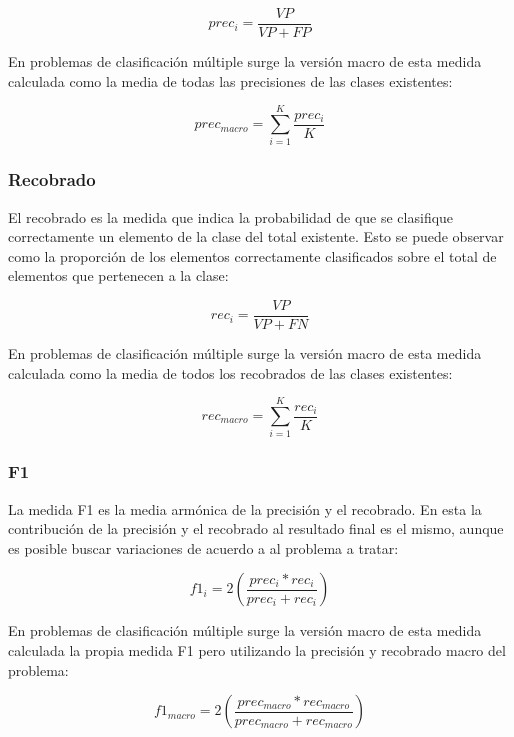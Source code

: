 \begin{equation}
	prec_i = \frac{VP}{VP + FP}
\end{equation}

En problemas de clasificación múltiple surge la versión macro de esta medida calculada como la media de todas
las precisiones de las clases existentes:

\begin{equation}
	prec_{macro} = \sum^K_{i=1} \frac{prec_i}{K}
\end{equation}

\subsubsection{Recobrado}

El recobrado es la medida que indica la probabilidad de que se clasifique correctamente un elemento de la clase
del total existente. Esto se puede observar como la proporción de los elementos correctamente clasificados sobre el 
total de elementos que pertenecen a la clase:

\begin{equation}
	rec_i = \frac{VP}{VP + FN}
\end{equation}

En problemas de clasificación múltiple surge la versión macro de esta medida calculada como la media de todos
los recobrados de las clases existentes:

\begin{equation}
	rec_{macro} = \sum^K_{i=1} \frac{rec_i}{K}
\end{equation}

\subsubsection{F1}

La medida F1 es la media armónica de la precisión y el recobrado. En esta la contribución de la precisión y el
recobrado al resultado final es el mismo, aunque es posible buscar variaciones de acuerdo a al problema a tratar:

\begin{equation}
	f1_i = 2 (\frac{prec_i * rec_i}{prec_i + rec_i})
\end{equation}

En problemas de clasificación múltiple surge la versión macro de esta medida calculada la propia medida F1 pero
utilizando la precisión y recobrado macro del problema:

\begin{equation}
	f1_{macro} = 2 (\frac{prec_{macro} * rec_{macro}}{prec_{macro} + rec_{macro}})
\end{equation}

